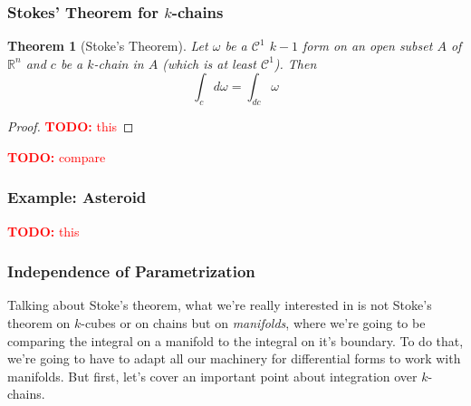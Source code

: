 \documentclass{article}
\newtheorem{theorem}{Theorem}
\newcommand{\reals}[0]{\mathbb{R}}
\newcommand{\mc}[1]{\mathcal{#1}}
\newcommand{\TODO}[1]{\textcolor{red}{\textbf{TODO:} #1}}
\begin{document}
\subsubsection{Stokes' Theorem for \(k\)-chains}

\begin{theorem}[Stoke's Theorem]

Let \(\omega\) be a \(\mc{C}^1\) \(k - 1\) form on an open subset \(A\) of \(\reals^n\) and \(c\) be a \(k\)-chain in \(A\) (which is at least \(\mc{C}^1\)). Then
\begin{equation}
  \int_cd\omega = \int_{dc}\omega
\end{equation}

\end{theorem}
\begin{proof}
  \TODO{this}
\end{proof}

\TODO{compare}

\subsubsection{Example: Asteroid}

\TODO{this}

\subsubsection{Independence of Parametrization}

Talking about Stoke's theorem, what we're really interested in is not Stoke's theorem on \(k\)-cubes or on chains but on \textit{manifolds}, where we're going to be comparing the integral on a manifold to the integral on it's boundary. To do that, we're going to have to adapt all our machinery for differential forms to work with manifolds. But first, let's cover an important point about integration over \(k\)-chains.
\end{document}
